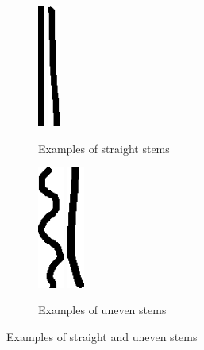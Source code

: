 \begin{figure}[h!]
    \centering
    
    \begin{subfigure}[b]{.4\linewidth}
    \centering
        \includegraphics[height=4cm]{gfx/implementation/stem-straightness/3876.png}
        \quad
        \includegraphics[height=4cm]{gfx/implementation/stem-straightness/5104.png}
        \caption{Examples of straight stems}
        \label{fig:straight-stems}
    \end{subfigure}
    \begin{subfigure}[b]{.4\linewidth}
        \centering
        \includegraphics[height=4cm]{gfx/implementation/stem-straightness/4912.png}
        \quad
        \includegraphics[height=4cm]{gfx/implementation/stem-straightness/5371.png}
        \caption{Examples of uneven stems}
        \label{fig:wonky-stems}
    \end{subfigure}
    
    \caption{Examples of straight and uneven stems}
    \label{fig:stem-straightness-examples}
\end{figure}



